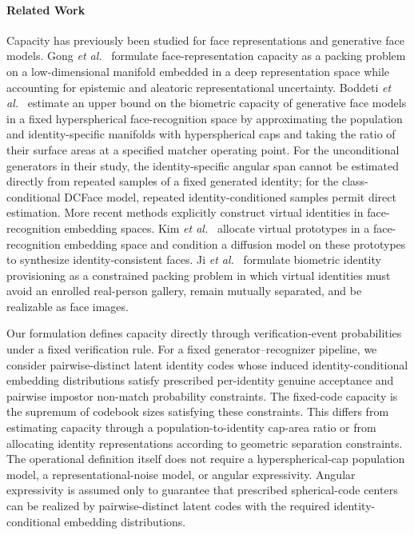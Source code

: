 \documentclass[journal]{IEEEtran}
\begin{document}
\begin{bibunit}
 
\paragraph*{Related Work}

Capacity has previously been studied for face representations and generative face models. Gong \textit{et al.}~\cite{gong2017capacity} formulate face-representation capacity as a packing problem on a low-dimensional manifold embedded in a deep representation space while accounting for epistemic and aleatoric representational uncertainty. Boddeti \textit{et al.}~\cite{boddeti2023biometric} estimate an upper bound on the biometric capacity of generative face models in a fixed hyperspherical face-recognition space by approximating the population and identity-specific manifolds with hyperspherical caps and taking the ratio of their surface areas at a specified matcher operating point. For the unconditional generators in their study, the identity-specific angular span cannot be estimated directly from repeated samples of a fixed generated identity; for the class-conditional DCFace model, repeated identity-conditioned samples permit direct estimation. More recent methods explicitly construct virtual identities in face-recognition embedding spaces. Kim \textit{et al.}~\cite{kim2025vigface} allocate virtual prototypes in a face-recognition embedding space and condition a diffusion model on these prototypes to synthesize identity-consistent faces. Ji \textit{et al.}~\cite{ji2026bip} formulate biometric identity provisioning as a constrained packing problem in which virtual identities must avoid an enrolled real-person gallery, remain mutually separated, and be realizable as face images.


Our formulation defines capacity directly through verification-event probabilities under a fixed verification rule. For a fixed generator--recognizer pipeline, we consider pairwise-distinct latent identity codes whose induced identity-conditional embedding distributions satisfy prescribed per-identity genuine acceptance and pairwise impostor non-match probability constraints. The fixed-code capacity is the supremum of codebook sizes satisfying these constraints. This differs from estimating capacity through a population-to-identity cap-area ratio or from allocating identity representations according to geometric separation constraints. The operational definition itself does not require a hyperspherical-cap population model, a representational-noise model, or angular expressivity. Angular expressivity is assumed only to guarantee that prescribed spherical-code centers can be realized by pairwise-distinct latent codes with the required identity-conditional embedding distributions.




\end{bibunit}
\end{document}
